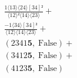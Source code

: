 \documentclass[varwidth, border=5pt]{standalone}
\begin{document}
\begin{my}
$\begin{gathered}
\scriptscriptstyle\frac{1⟨13⟩⟨24⟩[34]²}{⟨12⟩²⟨14⟩⟨23⟩} +\\
\scriptscriptstyle\frac{-1⟨34⟩[34]²}{⟨12⟩⟨14⟩⟨23⟩} +\\
\scriptscriptstyle(2341𝟓,\;\text{False}) +\\
\scriptscriptstyle(3412𝟓,\;\text{False}) +\\
\scriptscriptstyle(4123𝟓,\;\text{False}) \phantom{+}
\end{gathered}$
\end{my}
\end{document}
